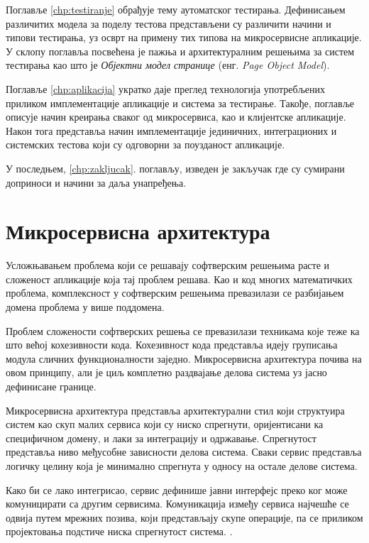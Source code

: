\documentclass[12pt,oneside]{memoir}
\begin{document}
Поглавље \ref{chp:testiranje} обрађује тему аутоматског тестирања. Дефинисањем различитих модела за поделу тестова представљени су различити начини и типови тестирања, уз осврт на примену тих типова на микросервисне апликације. У склопу поглавља посвећена је пажња и архитектуралним решењима за систем тестирања као што је \textit{Објектни модел странице} (енг. \textit{Page Object Model}).

Поглавље \ref{chp:aplikacija} укратко даје преглед технологија употребљених приликом имплементације апликације и система за тестирање. Такође, поглавље описује начин креирања сваког од микросервиса, као и клијентске апликације. Након тога представља начин имплементације јединичних, интеграционих и системских тестова који су одговорни за поузданост апликације.

 У последњем, \ref{chp:zakljucak}. поглављу, изведен је закључак где су сумирани доприноси и начини за даља унапређења.



\chapter{Микросервисна архитектура}
\label{chp:mikroservisi}

Усложњавањем проблема који се решавају софтверским решењима расте и сложеност апликације која тај проблем решава. Као и код многих математичких проблема, комплексност у софтверским решењима превазилази се разбијањем домена проблема у више поддомена. 

Проблем сложености софтверских решења се превазилази техникама које теже ка што већој кохезивности кода. Кохезивност кода представља идеју груписања модула сличних функционалности заједно. Микросервисна архитектура почива на овом принципу, али је циљ комплетно раздвајање делова система уз јасно дефинисане границе. 

Микросервисна архитектура представља архитектурални стил који структуира систем као скуп малих сервиса који су ниско спрегнути, оријентисани ка специфичном домену, и лаки за интеграцију и одржавање. Спрегнутост представља ниво међусобне зависности делова система. Сваки сервис представља логичку целину која је минимално спрегнута у односу на остале делове система. 

Како би се лако интегрисао, сервис дефинише јавни интерфејс преко ког може комуницирати са другим сервисима. Комуникација између сервиса најчешће се одвија путем мрежних позива, који представљају скупе операције, па се приликом пројектовања подстиче ниска спрегнутост система. \cite{microservicesBook}.
\end{document}
